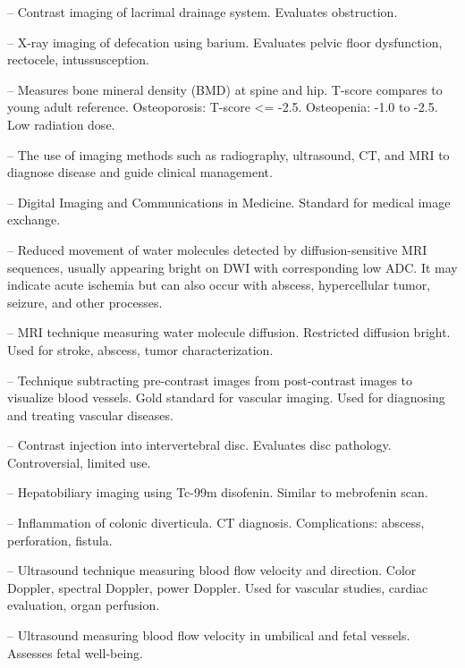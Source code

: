 -- Contrast imaging of lacrimal drainage system. Evaluates obstruction.

-- X-ray imaging of defecation using barium. Evaluates pelvic floor dysfunction, rectocele, intussusception.

-- Measures bone mineral density (BMD) at spine and hip. T-score compares to young adult reference. Osteoporosis: T-score <= -2.5. Osteopenia: -1.0 to -2.5. Low radiation dose.

-- The use of imaging methods such as radiography, ultrasound, CT, and MRI to diagnose disease and guide clinical management.

-- Digital Imaging and Communications in Medicine. Standard for medical image exchange.

-- Reduced movement of water molecules detected by diffusion-sensitive MRI sequences, usually appearing bright on DWI with corresponding low ADC. It may indicate acute ischemia but can also occur with abscess, hypercellular tumor, seizure, and other processes.

-- MRI technique measuring water molecule diffusion. Restricted diffusion bright. Used for stroke, abscess, tumor characterization.

-- Technique subtracting pre-contrast images from post-contrast images to visualize blood vessels. Gold standard for vascular imaging. Used for diagnosing and treating vascular diseases.

-- Contrast injection into intervertebral disc. Evaluates disc pathology. Controversial, limited use.

-- Hepatobiliary imaging using Tc-99m disofenin. Similar to mebrofenin scan.

-- Inflammation of colonic diverticula. CT diagnosis. Complications: abscess, perforation, fistula.

-- Ultrasound technique measuring blood flow velocity and direction. Color Doppler, spectral Doppler, power Doppler. Used for vascular studies, cardiac evaluation, organ perfusion.

-- Ultrasound measuring blood flow velocity in umbilical and fetal vessels. Assesses fetal well-being.

